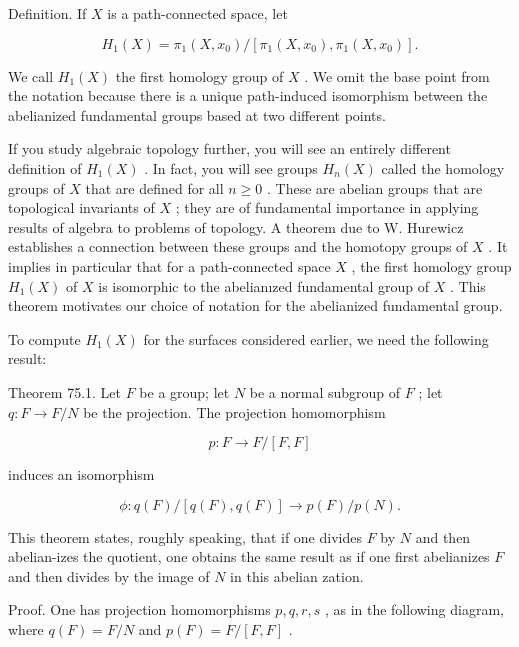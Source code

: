 Definition. If \(X\) is a path-connected space, let

\[
{H}_{1}\left( X\right)  = {\pi }_{1}\left( {X,{x}_{0}}\right) /\left\lbrack  {{\pi }_{1}\left( {X,{x}_{0}}\right) ,{\pi }_{1}\left( {X,{x}_{0}}\right) }\right\rbrack  .
\]

We call \({H}_{1}\left( X\right)\) the first homology group of \(X\) . We omit the base point from the notation because there is a unique path-induced isomorphism between the abelianized fundamental groups based at two different points.

If you study algebraic topology further, you will see an entirely different definition of \({H}_{1}\left( X\right)\) . In fact, you will see groups \({H}_{n}\left( X\right)\) called the homology groups of \(X\) that are defined for all \(n \geq  0\) . These are abelian groups that are topological invariants of \(X\) ; they are of fundamental importance in applying results of algebra to problems of topology. A theorem due to W. Hurewicz establishes a connection between these groups and the homotopy groups of \(X\) . It implies in particular that for a path-connected space \(X\) , the first homology group \({H}_{1}\left( X\right)\) of \(X\) is isomorphic to the abelianızed fundamental group of \(X\) . This theorem motivates our choice of notation for the abelianized fundamental group.

To compute \({H}_{1}\left( X\right)\) for the surfaces considered earlier, we need the following result:

Theorem 75.1. Let \(F\) be a group; let \(N\) be a normal subgroup of \(F\) ; let \(q : F \rightarrow  F/N\) be the projection. The projection homomorphism

\[
p : F \rightarrow  F/\left\lbrack  {F,F}\right\rbrack
\]

induces an isomorphism

\[
\phi  : q\left( F\right) /\left\lbrack  {q\left( F\right) ,q\left( F\right) }\right\rbrack   \rightarrow  p\left( F\right) /p\left( N\right) .
\]

This theorem states, roughly speaking, that if one divides \(F\) by \(N\) and then abelian-izes the quotient, one obtains the same result as if one first abelianizes \(F\) and then divides by the image of \(N\) in this abelian zation.

Proof. One has projection homomorphisms \(p,q,r,s\) , as in the following diagram, where \(q\left( F\right)  = F/N\) and \(p\left( F\right)  = F/\left\lbrack  {F,F}\right\rbrack\) .

